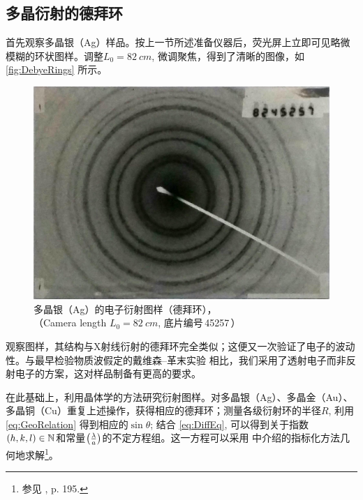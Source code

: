 \documentclass[aps,pre,12pt,preprint,%
	onecolumn,showpacs,showkeys,nofootinbib]{revtex4-2}
\begin{document}
\subsection{多晶衍射的德拜环}
	首先观察多晶银（Ag）样品。按上一节所述准备仪器后，荧光屏上立即可见略微模糊的环状图样。调整$L_0 = \SI{82}{cm}$, 微调聚焦，得到了清晰的图像，如 \autoref{fig:DebyeRings} 所示。
	
	\begin{figure}[!ht]
	\centering
	\includegraphics[width=.7\linewidth]{DebyeRings}
	\caption{多晶银（\textup{Ag}）的电子衍射图样（德拜环），\\
		（Camera length $L_0 = \SI{82}{cm}$, 
		底片编号\textnumero\,45257\,）}
	\label{fig:DebyeRings}
	\end{figure}
\FloatBarrier
	
	观察图样，其结构与X射线衍射的德拜环完全类似；这便又一次验证了电子的波动性。与最早检验物质波假定的戴维森--革末实验 \cite{davisson1927diffraction} 相比，我们采用了透射电子而非反射电子的方案，这对样品制备有更高的要求。
	
	\newparagraph
	在此基础上，利用晶体学的方法研究衍射图样。对多晶银（Ag）、多晶金（Au）、多晶铜（Cu）重复上述操作，获得相应的德拜环；测量各级衍射环的半径$R$, 利用 \eqref{eq:GeoRelation} 得到相应的$\sin\theta$; 结合 \eqref{eq:DiffEq}, 可以得到关于指数$(h,k,l) \in \mathbb{N}$和常量$\pqty{\frac{\lambda}{a}}$的不定方程组。这一方程可以采用 \cite{textbook} 中介绍的指标化方法几何地求解\footnote{%
		参见 \cite{textbook}, p. 195. }。
	
\end{document}
